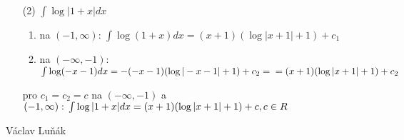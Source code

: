 \documentclass[11pt,a4paper,openright]{letter}
\begin{document}
\linespread{1.6}
\begin{enumerate}



\item[(2)] 
$ \int \log \vert 1+x \vert dx $
\begin{enumerate}
\item 
na $(-1, \infty)$: $ \int \log(1+x) dx = (x+1)(\log \vert x+1 \vert+ 1) + c_1$
\item
na $(-\infty, -1)$: $ \int \log(-x-1) dx = -(-x-1)(\log \vert -x-1 \vert + 1) + c_2 = \\ = (x+1)(\log\vert x+1 \vert + 1) + c_2$
\end{enumerate}
pro $c_1 = c_2 = c$ na $(-\infty, -1)$ a $ (-1, \infty): \\
\int \log\vert 1+x \vert dx = (x+1)(\log\vert x+1 \vert + 1) + c, c \in R $
\end{enumerate}

Václav Luňák
\end{document}
